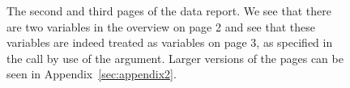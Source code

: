 \documentclass[article,shortnames]{jss}
\begin{document}
\begin{figure}[tb]
\begin{center}
\end{center}
\caption{The second and third pages of the  data report. We see that there are two  variables in the overview on page 2 and see that these variables are indeed treated as  variables on page 3, as specified in the  call by use of the  argument. Larger versions of the pages can be seen in
  Appendix~\ref{sec:appendix2}.}
\label{fig:bigExampleP23}
\end{figure}
\end{document}
